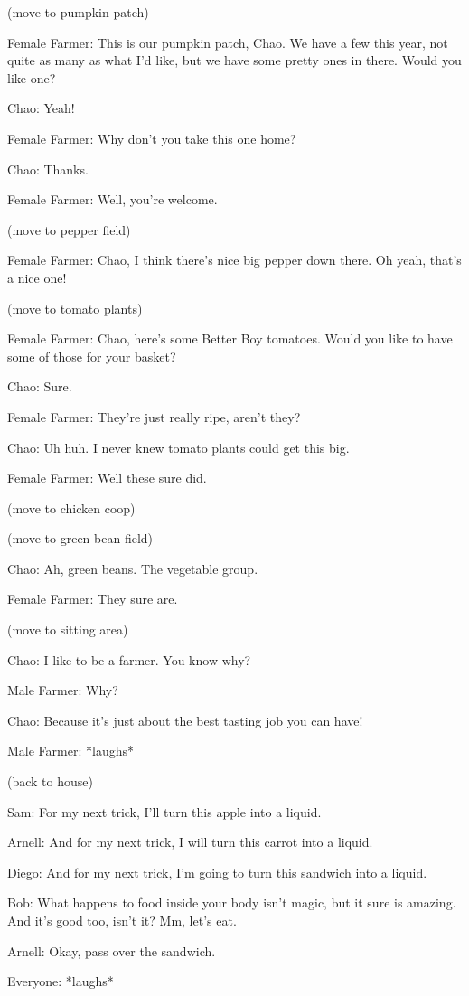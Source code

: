 (move to pumpkin patch)

Female Farmer: This is our pumpkin patch, Chao. We have a few this year, not quite as many as what I'd like, but we have some pretty ones in there. Would you like one?

Chao: Yeah!

Female Farmer: Why don't you take this one home?

Chao: Thanks.

Female Farmer: Well, you're welcome.

(move to pepper field)

Female Farmer: Chao, I think there's nice big pepper down there. Oh yeah, that's a nice one!

(move to tomato plants)

Female Farmer: Chao, here's some Better Boy tomatoes. Would you like to have some of those for your basket?

Chao: Sure.

Female Farmer: They're just really ripe, aren't they?

Chao: Uh huh. I never knew tomato plants could get this big.

Female Farmer: Well these sure did.

(move to chicken coop)

(move to green bean field)

Chao: Ah, green beans. The vegetable group.

Female Farmer: They sure are.

(move to sitting area)

Chao: I like to be a farmer. You know why?

Male Farmer: Why?

Chao: Because it's just about the best tasting job you can have!

Male Farmer: *laughs*

(back to house)

Sam: For my next trick, I'll turn this apple into a liquid.

Arnell: And for my next trick, I will turn this carrot into a liquid.

Diego: And for my next trick, I'm going to turn this sandwich into a liquid.

Bob: What happens to food inside your body isn't magic, but it sure is amazing. And it's good too, isn't it? Mm, let's eat.

Arnell: Okay, pass over the sandwich.

Everyone: *laughs*

